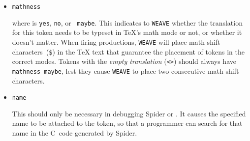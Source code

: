 \begin{itemize}
\item
{\tt mathness }

where   is {\tt yes}, {\tt no}, or {\tt
maybe}.
This indicates to {\tt WEAVE} whether the translation for this token
needs to be typeset in {\TeX}'s math mode or not, or whether it
doesn't matter.
When firing productions,
{\tt WEAVE} will place math shift characters~(\verb+$+) in the {\TeX}
text that guarantee the placement of tokens in the correct modes.
Tokens with the {\em empty translation} (\verb+<>+) should always have
{\tt mathness maybe}, lest they cause {\tt WEAVE} to place two
consecutive math shift characters.

\item 
{\tt name }

This should only be necessary in debugging {Spider} or {\WEB}.
It causes the specified name to be attached to the token, so that a
programmer can search for that name in the C~code generated by 
{Spider}.

\end{itemize}

